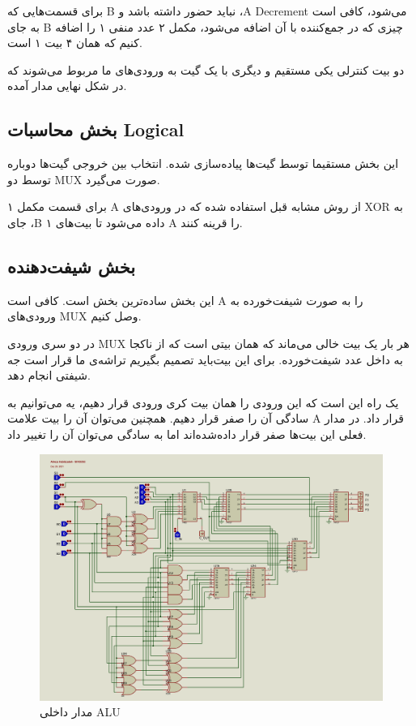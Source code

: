 برای قسمت‌هایی که 
B
نباید حضور داشته باشد و 
،A
Decrement
می‌شود، کافی است
به جای B
چیزی که در جمع‌کننده با آن اضافه می‌شود، مکمل ۲ عدد منفی ۱ را اضافه کنیم که همان ۴ بیت ۱ است.

دو بیت کنترلی یکی مستقیم و دیگری با یک گیت به ورودی‌های ما مربوط می‌شوند که در شکل نهایی مدار آمده.

\subsection{بخش محاسبات Logical}
این بخش مستقیما توسط گیت‌ها پیاده‌سازی شده.
انتخاب بین خروجی گیت‌ها دوباره توسط دو
MUX
صورت می‌گیرد.

برای قسمت مکمل ۱ 
A
از روش مشابه قبل استفاده شده که در ورودی‌های
XOR
به جای
،B
۱
داده می‌شود تا بیت‌های
A
را قرینه کنند.

\subsection{بخش شیفت‌دهنده}
این بخش ساده‌ترین بخش است.
کافی است
A
را به صورت شیفت‌خورده به 
ورودی‌های
MUX
وصل کنیم.

در دو سری ورودی
MUX
هر بار یک بیت خالی می‌ماند که همان بیتی است که از ناکجا به داخل عدد شیفت‌خورده.
برای این بیت‌باید تصمیم بگیریم تراشه‌ی ما قرار است جه شیفتی انجام دهد.

یک راه این است که این ورودی را همان بیت کری ورودی قرار دهیم، یه می‌توانیم به سادگی آن را صفر قرار دهیم.
همچنین می‌توان آن را بیت علامت 
A
قرار داد.
در مدار فعلی این بیت‌ها صفر قرار داده‌شده‌اند اما به سادگی می‌توان آن را تغییر داد.

\begin{figure}[h!]
    \centering
    \includegraphics[width=\textwidth]{part2/ALU.png}
    \caption{
    مدار داخلی
    ALU
    }
\end{figure}